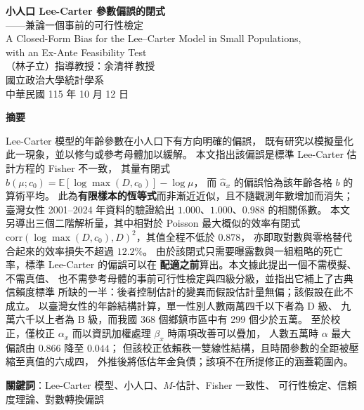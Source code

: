\documentclass[UTF8, fontset=macnew, a4paper, 12pt]{ctexart}
\newcommand{\Ex}{\mathbb{E}}
\begin{document}

\begin{center}
{\bfseries 小人口 Lee-Carter 參數偏誤的閉式}\\[4pt]
{ ——兼論一個事前的可行性檢定}\\[6pt]
{ A Closed-Form Bias for the Lee--Carter Model in Small Populations,}\\[2pt]
{ with an Ex-Ante Feasibility Test}\\[12pt]
{ （林子立）\quad 指導教授：余清祥\,教授}\\[4pt]
{ 國立政治大學統計學系}\\[4pt]
{ 中華民國 115 年 10 月 12 日}
\end{center}

\vspace{6pt}
\begin{center}
\begin{minipage}{0.92\textwidth}
\small
\textbf{摘要}\par\vspace{4pt}
Lee-Carter 模型的年齡參數在小人口下有方向明確的偏誤，
既有研究以模擬量化此一現象，並以修勻或參考母體加以緩解。
本文指出該偏誤是標準 Lee-Carter 估計方程的 Fisher 不一致，
其量有閉式 $b(\mu;c_0)=\Ex[\log\max(D,c_0)]-\log\mu$，
而 $\hat\alpha_x$ 的偏誤恰為該年齡各格 $b$ 的算術平均。
此為\textbf{有限樣本的恆等式}而非漸近近似，且不隨觀測年數增加而消失；
臺灣女性 2001--2024 年資料的驗證給出 $1.000$、$1.000$、$0.988$ 的相關係數。
本文另導出三個二階解析量，其中相對於 Poisson 最大概似的效率有閉式
$\mathrm{corr}(\log\max(D,c_0),D)^2$，其值全程不低於 $0.878$，
亦即取對數與零格替代合起來的效率損失不超過 $12.2\%$。
由於該閉式只需要曝露數與一組粗略的死亡率，標準 Lee-Carter 的偏誤可以在
\textbf{配適之前}算出。本文據此提出一個不需模擬、不需真值、
也不需參考母體的事前可行性檢定與四級分級，並指出它補上了古典信賴度標準
所缺的一半：後者控制估計的變異而假設估計量無偏；該假設在此不成立。
以臺灣女性的年齡結構計算，單一性別人數兩萬四千以下者為 D 級、
九萬六千以上者為 B 級，而我國 368 個鄉鎮市區中有 299 個少於五萬。
至於校正，僅校正 $\alpha_x$ 而以資訊加權處理 $\beta_x$ 時兩項改善可以疊加，
人數五萬時 $\alpha$ 最大偏誤由 $0.866$ 降至 $0.044$；
但該校正依賴秩一雙線性結構，且時間參數的全距被壓縮至真值的六成四，
外推後將低估年金負債；該項不在所提修正的涵蓋範圍內。
\par\vspace{6pt}
\textbf{關鍵詞}：Lee-Carter 模型、小人口、$M$-估計、Fisher 一致性、
可行性檢定、信賴度理論、對數轉換偏誤
\end{minipage}
\end{center}
\end{document}
